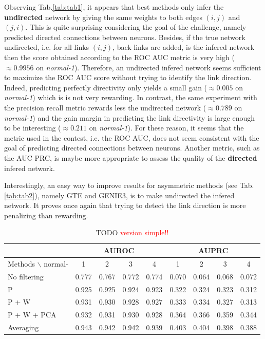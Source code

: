\documentclass[wcp]{jmlr}
\begin{document}
Observing Tab.\ref{tab:tab1}, it appears that best methods only infer the
\textbf{undirected} network by giving the same weights to both edges $(i,j)$
and $(j,i)$. This is quite surprising considering the goal of the challenge,
namely predicted directed connections between neurons. Besides, if the true
network undirected, i.e. for all links $(i,j)$, back links are added, is the
infered network then the score obtained according to the ROC AUC metric is
very high ($\approx 0.9956$ on \textit{normal-1}). Therefore, an undirected
infered network seems sufficient to maximize the ROC AUC score without trying
to identify the link direction. Indeed, predicting perfectly directivity only
yields a small gain ($\approx 0.005$ on \textit{normal-1}) which is is not
very rewarding. In contrast, the same experiment with the precision recall
metric rewards less the undirected network ($\approx 0.789$ on
\textit{normal-1}) and the gain margin in predicting the link directivity is
large enough to be interesting ($\approx 0.211$ on \textit{normal-1}). For
these reason, it seems that the metric used in the contest, i.e. the ROC AUC,
does not seem consistent with the goal of predicting directed connections
between neurons. Another metric, such as the AUC PRC, is maybe more
appropriate to assess the quality of the \textbf{directed} infered network.

Interestingly, an easy way to improve results for asymmetric methods (see
Tab.\ref{tab:tab2}), namely GTE and GENIE3, is to make undirected the infered
network. It proves once again that trying to detect the link direction is more
penalizing than rewarding.


\begin{table}[tbh]
\centering
\begin{tabular}{@{}l *{8}{c}@{}}
\hline
  & \multicolumn{4}{c}{AUROC} & \multicolumn{4}{c}{AUPRC} \\
\hline
Methods $\backslash$ normal- & 1 & 2 & 3 & 4 & 1 & 2 & 3 & 4 \\
No  filtering       & 0.777 & 0.767 & 0.772 & 0.774 & 0.070 & 0.064 & 0.068 & 0.072\\
P                   & 0.925 & 0.925 & 0.924 & 0.923 & 0.322 & 0.324 & 0.323 & 0.312\\
P + W               & 0.931 & 0.930 & 0.928 & 0.927 & 0.333 & 0.334 & 0.327 & 0.313\\
P + W + PCA         & 0.932 & 0.931 & 0.930 & 0.928 & 0.364 & 0.366 & 0.359 & 0.344\\
Averaging           & 0.943 & 0.942 & 0.942 & 0.939 & 0.403 & 0.404 & 0.398 & 0.388\\
\end{tabular}
\caption{TODO \textcolor{red}{version simple!!}}
\label{tab:tab3}
\end{table}
\end{document}
